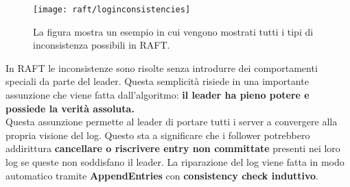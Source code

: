   \begin{figure}[H]
    \centering
    \texttt{[image: raft/loginconsistencies]}
    \caption[inconsistency]{La figura mostra un esempio in cui vengono mostrati tutti i tipi di inconsistenza possibili in RAFT.}
    \label{fig:figure9}
  \end{figure}
  In RAFT le inconsistenze sono risolte senza introdurre dei comportamenti speciali da parte del leader. Questa semplicità risiede in una importante assunzione che viene fatta dall'algoritmo: \textbf{il leader ha pieno potere e possiede la verità assoluta.}\\
  Questa assunzione permette al leader di portare tutti i server a convergere alla propria visione del log. Questo sta a significare che i follower potrebbero addirittura \textbf{cancellare o riscrivere entry non committate} presenti nei loro log se queste non soddisfano il leader. La riparazione del log viene fatta in modo automatico tramite \textbf{AppendEntries} con \textbf{consistency check induttivo}.